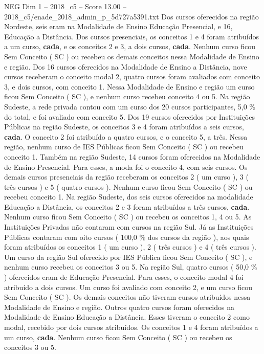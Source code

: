 \begin{textsample}{NEG Dim 1 – 2018\_c5 – Score 13.00 – 2018\_c5/enade\_2018\_admin\_p\_5d727a5391.txt}
Dos cursos oferecidos na região Nordeste, seis eram na Modalidade de Ensino Educação Presencial, e 16, Educação a Distância.
Dos cursos presenciais, os conceitos 1 e 4 foram atribuídos a um curso, \textbf{cada}, e os conceitos 2 e 3, a dois cursos, \textbf{cada}.
Nenhum curso ficou Sem Conceito ( SC ) ou recebeu os demais conceitos nessa Modalidade de Ensino e região.
Dos 16 cursos oferecidos na Modalidade de Ensino a Distância, nove cursos receberam o conceito modal 2, quatro cursos foram avaliados com conceito 3, e dois cursos, com conceito 1.
Nessa Modalidade de Ensino e região um curso ficou Sem Conceito ( SC ), e nenhum curso recebeu conceito 4 ou 5.
Na região Sudeste, a rede privada contou com um curso dos 20 cursos participantes, 5,0 \% do total, e foi avaliado com conceito 5.
Dos 19 cursos oferecidos por Instituições Públicas na região Sudeste, os conceitos 3 e 4 foram atribuídos a seis cursos, \textbf{cada}.
O conceito 2 foi atribuído a quatro cursos, e o conceito 5, a três.
Nessa região, nenhum curso de IES Públicas ficou Sem Conceito ( SC ) ou recebeu conceito 1.
Também na região Sudeste, 14 cursos foram oferecidos na Modalidade de Ensino Presencial.
Para esses, a moda foi o conceito 4, com seis cursos.
Os demais cursos presenciais da região receberam os conceitos 2 ( um curso ), 3 ( três cursos ) e 5 ( quatro cursos ).
Nenhum curso ficou Sem Conceito ( SC ) ou recebeu conceito 1.
Na região Sudeste, dos seis cursos oferecidos na modalidade Educação a Distância, os conceitos 2 e 3 foram atribuídos a três cursos, \textbf{cada}.
Nenhum curso ficou Sem Conceito ( SC ) ou recebeu os conceitos 1, 4 ou 5.
As Instituições Privadas não contaram com cursos na região Sul.
Já as Instituições Públicas contaram com oito cursos ( 100,0 \% dos cursos da região ), aos quais foram atribuídos os conceitos 1 ( um curso ), 2 ( três cursos ) e 4 ( três cursos ).
Um curso da região Sul oferecido por IES Pública ficou Sem Conceito ( SC ), e nenhum curso recebeu os conceitos 3 ou 5.
Na região Sul, quatro cursos ( 50,0 \% ) oferecidos eram de Educação Presencial.
Para esses, o conceito modal 4 foi atribuído a dois cursos.
Um curso foi avaliado com conceito 2, e um curso ficou Sem Conceito ( SC ).
Os demais conceitos não tiveram cursos atribuídos nessa Modalidade de Ensino e região.
Outros quatro cursos foram oferecidos na Modalidade de Ensino Educação a Distância.
Esses tiveram o conceito 2 como modal, recebido por dois cursos atribuídos.
Os conceitos 1 e 4 foram atribuídos a um curso, \textbf{cada}.
Nenhum curso ficou Sem Conceito ( SC ) ou recebeu os conceitos 3 ou 5.

\end{textsample}
